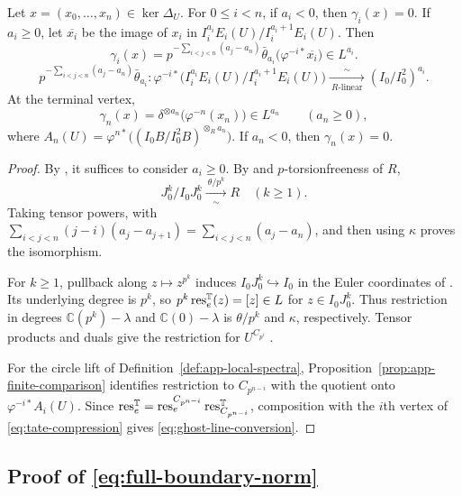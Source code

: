 \begin{proposition}\label{prop:geometric-fixed-point-coordinates}
Let $x=(x_0,\ldots,x_n)\in\ker\Delta_U$.
For $0\le i<n$, if $a_i<0$, then $\gamma_i(x)=0$.
If $a_i\ge0$, let $\overline{x_i}$ be the image of $x_i$ in
$I_i^{a_i}E_i(U)/I_i^{a_i+1}E_i(U)$.
Then
\begin{equation}\label{eq:ghost-line-conversion}
\gamma_i(x)
=p^{-\sum_{i<j<n}(a_j-a_n)}
\bar\theta_{a_i}\bigl(\varphi^{-i*}\overline{x_i}\bigr)
\in L^{a_i}.
\end{equation}
\[
p^{-\sum_{i<j<n}(a_j-a_n)}\bar\theta_{a_i}:
\varphi^{-i*}\bigl(I_i^{a_i}E_i(U)/I_i^{a_i+1}E_i(U)\bigr)
\xrightarrow[\ R\text{-linear}\ ]{\sim}(I_0/I_0^2)^{a_i}.
\]
At the terminal vertex,
\[
\gamma_n(x)=\delta^{\otimes a_n}\bigl(\varphi^{-n}(x_n)\bigr)
\in L^{a_n}\qquad(a_n\ge0),
\]
where $A_n(U)=\varphi^{n*}\bigl((I_0B/I_0^2B)^{\otimes_R a_n}\bigr)$.
If $a_n<0$, then $\gamma_n(x)=0$.
\end{proposition}

\begin{proof}
By \cite[Theorem~6.1]{BMS}, it suffices to consider $a_i\ge0$.
By \cite[Lemma~2.2.8]{BhattLurie} and $p$-torsionfreeness of $R$,
\[
J_0^k/I_0J_0^k\xrightarrow[\sim]{\ \theta/p^k\ }R
\quad(k\ge1).
\]
Taking tensor powers, with
$\sum_{i<j<n}(j-i)(a_j-a_{j+1})=\sum_{i<j<n}(a_j-a_n)$,
and then using $\kappa$ proves the isomorphism.

For $k\ge1$, pullback along $z\mapsto z^{p^k}$ induces
$I_0J_0^k\hookrightarrow I_0$ in the Euler coordinates
of \cite[Notation~2.11 and Example~3.2]{SulymaNew}. Its underlying
degree is $p^k$, so $p^k\operatorname{res}_e^{\mathbb T}(z)=[z]\in L$ for $z\in I_0J_0^k$.
Thus restriction in degrees $\mathbb C(p^k)-\lambda$ and
$\mathbb C(0)-\lambda$ is $\theta/p^k$ and $\kappa$, respectively.
Tensor products and duals give the restriction for $U^{C_{p^i}}$
\cite[Remark~3.1 and Examples~3.3--3.4]{SulymaNew}.

For the circle lift of Definition~\ref{def:app-local-spectra},
Proposition~\ref{prop:app-finite-comparison} identifies restriction
to $C_{p^{n-i}}$ with the quotient onto $\varphi^{-i*}A_i(U)$.
Since $\operatorname{res}_e^{\mathbb T}
=\operatorname{res}_e^{C_{p^{n-i}}}\operatorname{res}_{C_{p^{n-i}}}^{\mathbb T}$,
composition with the $i$th vertex of \eqref{eq:tate-compression}
gives \eqref{eq:ghost-line-conversion}.
\end{proof}

\subsection{Proof of \eqref{eq:full-boundary-norm}}
\label{app:full-cut-norms}

